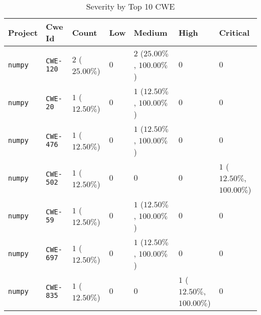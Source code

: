\begin{table}
\caption{Severity by Top 10 CWE}
\label{tab:cwe-distribution}
\begin{tabular}{lllllll}
\toprule
Project & Cwe Id & Count & Low & Medium & High & Critical \\
\midrule
\texttt{numpy} & \texttt{CWE-120} & $2$ ($25.00\%$) & $0$ & $2$ ($25.00\%$, $100.00\%$) & $0$ & $0$ \\
\texttt{numpy} & \texttt{CWE-20} & $1$ ($12.50\%$) & $0$ & $1$ ($12.50\%$, $100.00\%$) & $0$ & $0$ \\
\texttt{numpy} & \texttt{CWE-476} & $1$ ($12.50\%$) & $0$ & $1$ ($12.50\%$, $100.00\%$) & $0$ & $0$ \\
\texttt{numpy} & \texttt{CWE-502} & $1$ ($12.50\%$) & $0$ & $0$ & $0$ & $1$ ($12.50\%$, $100.00\%$) \\
\texttt{numpy} & \texttt{CWE-59} & $1$ ($12.50\%$) & $0$ & $1$ ($12.50\%$, $100.00\%$) & $0$ & $0$ \\
\texttt{numpy} & \texttt{CWE-697} & $1$ ($12.50\%$) & $0$ & $1$ ($12.50\%$, $100.00\%$) & $0$ & $0$ \\
\texttt{numpy} & \texttt{CWE-835} & $1$ ($12.50\%$) & $0$ & $0$ & $1$ ($12.50\%$, $100.00\%$) & $0$ \\
\bottomrule
\end{tabular}
\end{table}
